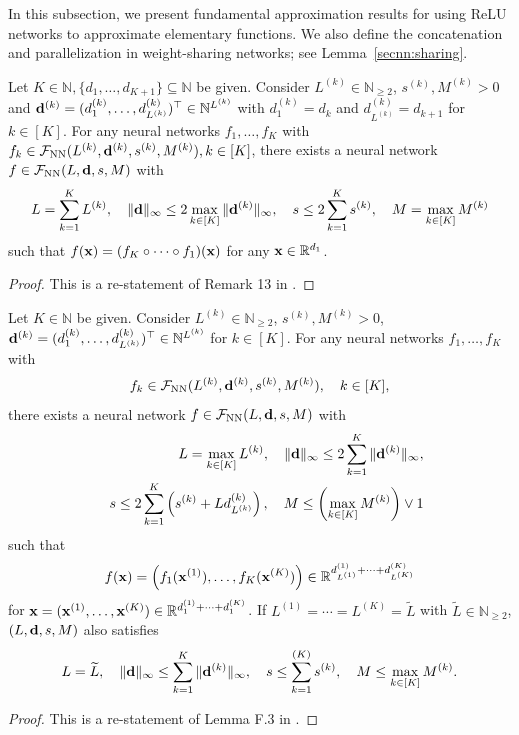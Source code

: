 \documentclass[twoside,11pt]{article}
\def\cF{\mathcal F}
\newcommand{\bd}{{\bf d}}
\newcommand{\bx}{{\bf x}}
\newcommand{\bbR}{{\mathbb R}}
\newcommand{\bbN}{{\mathbb N}}
\newcommand{\bean}{\setlength\arraycolsep{1pt}\begin{eqnarray*}}
\newcommand{\eean}{\end{eqnarray*}}
\begin{document}
In this subsection, we present fundamental approximation results for using ReLU networks to approximate elementary functions.
We also define the concatenation and parallelization in weight-sharing networks; see Lemma~\ref{secnn:sharing}.

\begin{lemma}[Concatenation]
\label{secnn:comp}
Let $K \in \bbN, \{d_1,\ldots,d_{K+1}\} \subseteq \bbN$ be given. Consider $L^{(k)} \in \bbN_{\geq 2}$, $ s^{(k)}, M^{(k)} > 0$ and $\bd^{(k)} = (d_1^{(k)},\ldots,d_{L^{(k)}}^{(k)})^{\top} \in \bbN^{L^{(k)}}$ with $d_1^{(k)} = d_{k}$ and $ d_{L^{(k)}}^{(k)} = d_{k+1}$ for $k \in [K]$. For any neural networks $f_1,\ldots,f_{K}$ with $f_k \in \cF_{\rm NN}(L^{(k)},\bd^{(k)},s^{(k)}, M^{(k)}), k \in [K]$, there exists a neural network $f \in \cF_{\rm NN}(L,\bd,s,M)$ with 
\bean
L = \sum_{k=1}^{K} L^{(k)}, \quad \| \bd \|_{\infty} \leq 2 \max_{k \in [K]} \|\bd^{(k)}\|_{\infty}, \quad s \leq 2 \sum_{k=1}^{K} s^{(k)}, \quad M = \max_{k \in [K]} M^{(k)}
\eean
such that $f(\bx) = (f_K \circ \cdots \circ f_{1})(\bx) $ for any $\bx \in \bbR^{d_1}$.
\end{lemma}
\begin{proof}
This is a re-statement of Remark 13 in \citet{nakada2020adaptive}.
\end{proof}


\begin{lemma}[Parallelization]
\label{secnn:par}
Let $K \in \bbN$ be given. Consider $L^{(k)} \in \bbN_{\geq 2}$, $ s^{(k)}, M^{(k)} > 0$, $\bd^{(k)} = (d_1^{(k)},\ldots,d_{L^{(k)}}^{(k)})^{\top} \in \bbN^{L^{(k)}}$ for $k \in [K]$.
For any neural networks $f_1,\ldots,f_{K}$ with 
\bean
f_k \in \cF_{\rm NN} (L^{(k)}, \bd^{(k)}, s^{(k)}, M^{(k)} ), \quad k \in [K],
\eean
there exists a neural network $f \in \cF_{\rm NN}(L,\bd,s,M)$ with 
\bean
&& L = \max_{k \in [K]} L^{(k)}, \quad \|\bd\|_{\infty} \leq 2 \sum_{k=1}^{K} \|\bd^{(k)}\|_{\infty},
\\
&& s \leq 2\sum_{k=1}^{K} \left(s^{(k)} + L d_{L^{(k)}}^{(k)} \right), \quad M \leq \left(\max_{k \in [K]} M^{(k)} \right) \vee 1
\eean
such that
\bean
f(\bx) = \left( f_1(\bx^{(1)}),\ldots, f_K(\bx^{(K)}) \right) \in \bbR^{d_{L^{(1)}}^{(1)} + \cdots + d_{L^{(K)}}^{(K)}}
\eean
for $\bx = (\bx^{(1)},\ldots,\bx^{(K)}) \in \bbR^{d_1^{(1)}+\cdots+d_{1}^{(K)} }$. If $L^{(1)} = \cdots = L^{(K)} = \widetilde L$ with $\widetilde L \in \bbN_{\geq 2}$, $(L,\bd,s,M)$ also satisfies
\bean
L = \widetilde L, \quad \|\bd\|_{\infty} \leq \sum_{k=1}^{K} \|\bd^{(k)}\|_{\infty}, \quad s \leq \sum_{k=1}^{(K)} s^{(k)}, \quad M \leq  \max_{k \in [K]} M^{(k)}.
\eean
\end{lemma}
\begin{proof}
This is a re-statement of Lemma F.3 in \citet{oko2023diffusion}.
\end{proof}
\end{document}

